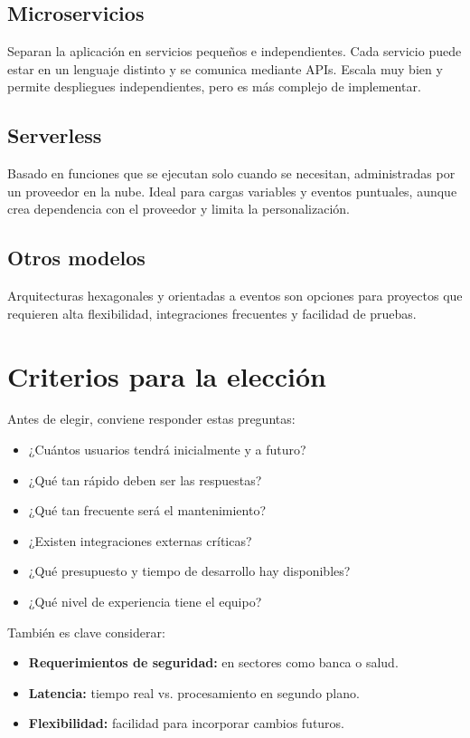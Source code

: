 \documentclass{article}
\begin{document}
\subsection{Microservicios}
Separan la aplicación en servicios pequeños e independientes. Cada servicio puede estar en un lenguaje distinto y se comunica mediante APIs. Escala muy bien y permite despliegues independientes, pero es más complejo de implementar.

\subsection{Serverless}
Basado en funciones que se ejecutan solo cuando se necesitan, administradas por un proveedor en la nube. Ideal para cargas variables y eventos puntuales, aunque crea dependencia con el proveedor y limita la personalización.

\subsection{Otros modelos}
Arquitecturas hexagonales y orientadas a eventos son opciones para proyectos que requieren alta flexibilidad, integraciones frecuentes y facilidad de pruebas.

\section{Criterios para la elección}

Antes de elegir, conviene responder estas preguntas:
\begin{itemize}
    \item ¿Cuántos usuarios tendrá inicialmente y a futuro?
    \item ¿Qué tan rápido deben ser las respuestas?
    \item ¿Qué tan frecuente será el mantenimiento?
    \item ¿Existen integraciones externas críticas?
    \item ¿Qué presupuesto y tiempo de desarrollo hay disponibles?
    \item ¿Qué nivel de experiencia tiene el equipo?
\end{itemize}

También es clave considerar:
\begin{itemize}
    \item \textbf{Requerimientos de seguridad:} en sectores como banca o salud.
    \item \textbf{Latencia:} tiempo real vs. procesamiento en segundo plano.
    \item \textbf{Flexibilidad:} facilidad para incorporar cambios futuros.
\end{itemize}
\end{document}
